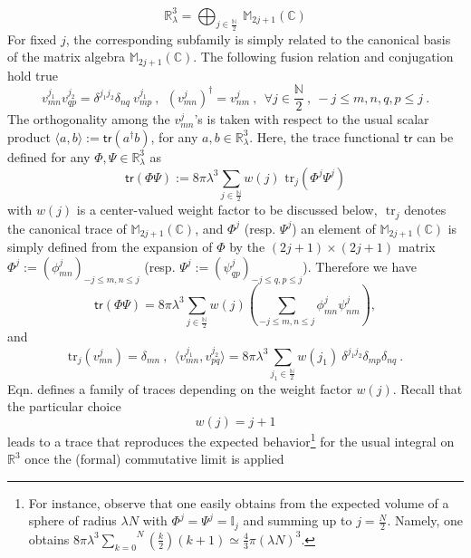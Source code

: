 \documentclass[10pt]{book}
\newcommand{\tr}{\mathsf{tr}}
\theoremstyle{break}
\begin{document}
%
\begin{equation}
\mathbb{R}^3_\lambda = \bigoplus_{j\in\frac{\mathbb{N}}{2}} \ \mathbb{M}_{2j+1}(\mathbb{C})%
\end{equation}
%
For fixed $j$, the corresponding subfamily is simply related to the canonical basis of the matrix algebra $\mathbb{M}_{2j+1}(\mathbb{C})$. The following fusion relation and conjugation hold true%
%
\begin{equation}
v^{j_1}_{mn} v^{j_2}_{qp} = \delta^{j_1j_2} \delta_{nq} \ v^{j_1}_{mp} \ , \ \ (v^j_{mn})^\dag=v^j_{nm} \ , \ \ 
\forall j\in\frac{\mathbb{N}}{2} \ , \ -j\le m,n,q,p\le j \ . %
\end{equation}
%
The orthogonality among the $v^j_{mn}$'s is taken with respect to the usual scalar product $\langle a,b\rangle:=\tr(a^\dag b)$, for any $a,b\in\mathbb{R}^3_\lambda$. Here, the trace functional $\tr$ can be defined %
for any $\Phi,\Psi\in\mathbb{R}^3_\lambda$ as%
%
\begin{equation}
\tr(\Phi\Psi) := 8 \pi \lambda^3 \sum_{j\in\frac{\mathbb{N}}{2}} w(j) \mbox{ tr}_j(\Phi^j\Psi^j)%
\end{equation}
%
with $w(j)$ is a center-valued weight factor to be discussed below, $\mbox{ tr}_j$ denotes the canonical trace of $\mathbb{M}_{2j+1}(\mathbb{C})$, and $\Phi^j$ (resp. $\Psi^j$) an element of $\mathbb{M}_{2j+1}(\mathbb{C})$ is simply defined from the expansion %
of $\Phi$ by the $(2j+1)\times(2j+1)$ matrix $\Phi^j:=(\phi^j_{mn})_{-j\le m,n\le j}$ (resp. $\Psi^j:= (\psi^j_{qp})_{-j\le q,p\le j}$). Therefore we have%
%
\begin{equation}
\tr(\Phi\Psi)  = 8 \pi \lambda^3 \sum_{j\in\frac{\mathbb{N}}{2}} w(j) \left( \sum_{-j\le m,n\le j}\phi^j_{mn}\psi^j_{nm}\right), %
\end{equation}
%
and%
%
\begin{equation}
\mbox{tr}_j(v^j_{mn}) = \delta_{mn} \ , \ \
\langle v^{j_1}_{mn} , v^{j_2}_{pq} \rangle = 8 \pi \lambda^3 \sum_{j_1\in\frac{\mathbb{N}}{2}} w(j_1) \ \delta^{j_1j_2} \delta_{mp} \delta_{nq} \ . %
\end{equation}
%
Eqn. %
defines a family of traces depending on the weight factor $w(j)$. Recall that the particular choice%
\begin{equation}
w(j)=j+1%
\end{equation}
%
leads to a trace that reproduces the expected behavior{\footnote{For instance, observe that one easily obtains from %
the expected volume of a sphere of radius $\lambda N$ with $\Phi^j=\Psi^j= \mathbb{I}_j$ and summing up to $j=\frac{N}{2}$. Namely, one obtains $8\pi\lambda^3\overset{N}{\underset{k=0}{\sum}}\left(\frac{k}{2}\right)(k+1)\simeq\frac43\pi\left(\lambda N\right)^3$.}} for the usual integral on $\mathbb{R}^3$ once the (formal) commutative limit is applied %
\end{document}
